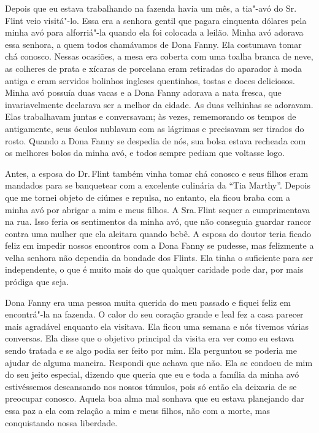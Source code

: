 Depois
que eu estava trabalhando na fazenda havia um mês, a tia"-avó do Sr.\,Flint veio visitá"-lo. Essa era a senhora gentil que pagara cinquenta
dólares pela minha avó para alforriá"-la quando ela foi colocada a
leilão. Minha avó adorava essa senhora, a quem todos chamávamos de Dona
Fanny. Ela costumava tomar chá conosco. Nessas ocasiões, a mesa era
coberta com uma toalha branca de neve, as colheres de prata e xícaras de
porcelana eram retiradas do aparador à moda antiga e eram servidos
bolinhos ingleses quentinhos, tostas e doces deliciosos. Minha avó
possuía duas vacas e a Dona Fanny adorava a nata fresca, que
invariavelmente declarava ser a melhor da cidade. As duas velhinhas se
adoravam. Elas trabalhavam juntas e conversavam; às vezes, rememorando
os tempos de antigamente, seus óculos nublavam com as lágrimas e
precisavam ser tirados do rosto. Quando a Dona Fanny se despedia de nós,
sua bolsa estava recheada com os melhores bolos da minha avó, e todos
sempre pediam que voltasse logo.

Antes, a esposa do Dr.\,Flint também
vinha tomar chá conosco e seus filhos eram mandados para se banquetear
com a excelente culinária da ``Tia Marthy''. Depois que me tornei objeto
de ciúmes e repulsa, no entanto, ela ficou braba com a minha avó por
abrigar a mim e meus filhos. A Sra.\,Flint sequer a cumprimentava na rua.
Isso feria os sentimentos da minha avó, que não conseguia guardar rancor
contra uma mulher que ela aleitara quando bebê. A esposa do doutor teria
ficado feliz em impedir nossos encontros com a Dona Fanny se pudesse,
mas felizmente a velha senhora não dependia da bondade dos Flints. Ela
tinha o suficiente para ser independente, o que é muito mais do que
qualquer caridade pode dar, por mais pródiga que seja.

Dona Fanny era uma pessoa muita querida
do meu passado e fiquei feliz em encontrá"-la na fazenda. O calor do seu
coração grande e leal fez a casa parecer mais agradável enquanto ela
visitava. Ela ficou uma semana e nós tivemos várias conversas. Ela disse
que o objetivo principal da visita era ver como eu estava sendo tratada
e se algo podia ser feito por mim. Ela perguntou se poderia me ajudar de
alguma maneira. Respondi que achava que não. Ela se condoeu de mim do
seu jeito especial, dizendo que queria que eu e toda a família da minha
avó estivéssemos descansando nos nossos túmulos, pois só então ela
deixaria de se preocupar conosco. Aquela boa alma mal sonhava que eu
estava planejando dar essa paz a ela com relação a mim e meus filhos,
não com a morte, mas conquistando nossa liberdade.

